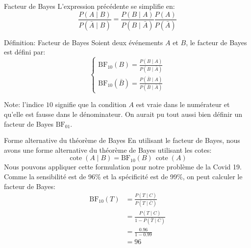 \documentclass[10pt]{beamer}  %
\newcommand{\cote}{\operatorname{cote}}
\begin{document}
\begin{frame}{Facteur de Bayes}
	L'expression précédente se simplifie en:
	\begin{equation}
		\frac{P(A \mid B)}{P(\bar{A} \mid B)} = \frac{P(B \mid A)}{P(B \mid \bar{A})} \frac{P(A)}{P(\bar{A})}
		\nonumber
	\end{equation}
	\begin{block}{Définition: Facteur de Bayes}
		Soient deux événements $A$ et $B$, le facteur de Bayes est défini par:
		\begin{equation}
			\begin{cases}
				\text{BF}_{10}(B) = \displaystyle \frac{P(B \mid A)}{P(B \mid \bar{A})} \\[10pt]
				\text{BF}_{10}(\bar{B}) = \displaystyle \frac{P(\bar{B} \mid A)}{P(\bar{B} \mid \bar{A})}
			\end{cases}
			\nonumber
		\end{equation}
	\end{block}
	Note: l'indice $10$ signifie que la condition $A$ est vraie dans le numérateur et qu'elle est fausse dans le dénominateur. On aurait pu tout aussi bien définir un facteur de Bayes $\text{BF}_{01}$.
\end{frame}

\begin{frame}{Forme alternative du théorème de Bayes}
	En utilisant le facteur de Bayes, nous avons une forme alternative du théorème de Bayes utilisant les cotes:
	\begin{equation}
		\cote(A \mid B) = \text{BF}_{10}(B) \, \cote(A)
		\nonumber
	\end{equation}
	\pause
	Nous pouvons appliquer cette formulation pour notre problème de la Covid 19. Comme la sensibilité est de 96\% et la spécificité est de 99\%, on peut calculer le facteur de Bayes:
	\begin{equation}
		\begin{aligned}
			\text{BF}_{10}(T) &= \frac{P(T \mid C)}{P(T \mid \bar{C})} \\
			                  &= \frac{P(T \mid C)}{1 - P(\bar{T} \mid \bar{C})} \\
			                  &= \frac{0.96}{1 - 0.99} \\
			                  &= 96
		\end{aligned}
		\nonumber
	\end{equation}
\end{frame}
\end{document}
